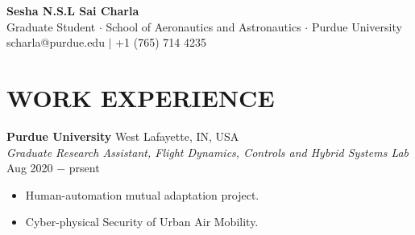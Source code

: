 \documentclass[letterpaper,11pt]{article}
\begin{document}
\begin{center}
\thispagestyle{empty}
\huge \textbf{Sesha N.S.L Sai Charla \\}
\small Graduate Student $\cdot$ School of Aeronautics and Astronautics $\cdot$ Purdue University\\
\small scharla@purdue.edu $\mid$ +1 (765) 714 4235   \\
\end{center}





% 
%
\section{WORK EXPERIENCE} 
\noindent \textbf{Purdue University} \hfill West Lafayette, IN, USA \\
\noindent \textit{Graduate Research Assistant, Flight Dynamics, Controls and Hybrid Systems Lab} \hfill Aug 2020 $-$ prsent
\begin{itemize}[noitemsep,nolistsep,leftmargin=0.25in,label={--}]
    \item Human-automation mutual adaptation project.
    \item Cyber-physical Security of Urban Air Mobility.
\end{itemize}
\end{document}
